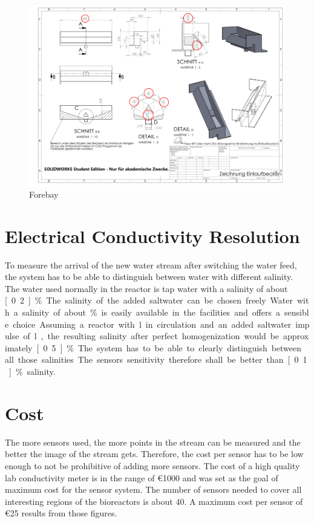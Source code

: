\begin{figure}
	\begin{center}
		\includegraphics[width=\textwidth]{images/Einlaufbecken.pdf} 
		\caption{Forebay}
		\label{fig:elb}
	\end{center}
\end{figure}

\section{Electrical Conductivity Resolution}

To measure the arrival of the new water stream after switching the water feed, the system has to be able to distinguish between water with different salinity. The water used normally in the reactor is tap water with a salinity of about \unit[0.2]{\%}. The salinity of the added saltwater can be chosen freely. Water with a salinity of about \unit[5]{\%} is easily available in the facilities and offers a sensible choice. Assuming a reactor with \unit[65]{l} in circulation and an added saltwater impulse of \unit[5]{l}, the resulting salinity after perfect homogenization would be approximately \unit[0.5]{\%}. The system has to be able to clearly distinguish between all those salinities. The sensors sensitivity therefore shall be better than \unit[0.1]{\%} salinity.

\section{Cost}

The more sensors used, the more points in the stream can be measured and the better the image of the stream gets. Therefore, the cost per sensor has to be low enough to not be prohibitive of adding more sensors.
The cost of a high quality lab conductivity meter is in the range of \euro{1000} and was set as the goal of maximum cost for the sensor system. The number of sensors needed to cover all interesting regions of the bioreactors is about 40.
A maximum cost per sensor of \euro{25} results from those figures.

